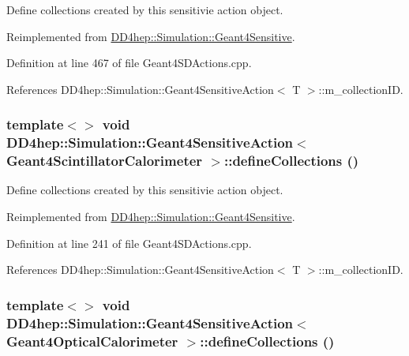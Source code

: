 Define collections created by this sensitivie action object. 

Reimplemented from \hyperlink{class_d_d4hep_1_1_simulation_1_1_geant4_sensitive_a88c872b79e49e399c8ee282960c2d77d}{DD4hep::Simulation::Geant4Sensitive}.

Definition at line 467 of file Geant4SDActions.cpp.

References DD4hep::Simulation::Geant4SensitiveAction$<$ T $>$::m\_\-collectionID.\hypertarget{class_d_d4hep_1_1_simulation_1_1_geant4_sensitive_action_a76b62dc60cda1378d90d578c247705d8}{
\subsubsection[{defineCollections}]{\setlength{\rightskip}{0pt plus 5cm}template$<$$>$ void {\bf DD4hep::Simulation::Geant4SensitiveAction}$<$ {\bf Geant4ScintillatorCalorimeter} $>$::defineCollections ()}}
\label{class_d_d4hep_1_1_simulation_1_1_geant4_sensitive_action_a76b62dc60cda1378d90d578c247705d8}


Define collections created by this sensitivie action object. 

Reimplemented from \hyperlink{class_d_d4hep_1_1_simulation_1_1_geant4_sensitive_a88c872b79e49e399c8ee282960c2d77d}{DD4hep::Simulation::Geant4Sensitive}.

Definition at line 241 of file Geant4SDActions.cpp.

References DD4hep::Simulation::Geant4SensitiveAction$<$ T $>$::m\_\-collectionID.\hypertarget{class_d_d4hep_1_1_simulation_1_1_geant4_sensitive_action_a6fec266f731814c2fb5aa21646032690}{
\subsubsection[{defineCollections}]{\setlength{\rightskip}{0pt plus 5cm}template$<$$>$ void {\bf DD4hep::Simulation::Geant4SensitiveAction}$<$ {\bf Geant4OpticalCalorimeter} $>$::defineCollections ()}}
\label{class_d_d4hep_1_1_simulation_1_1_geant4_sensitive_action_a6fec266f731814c2fb5aa21646032690}


